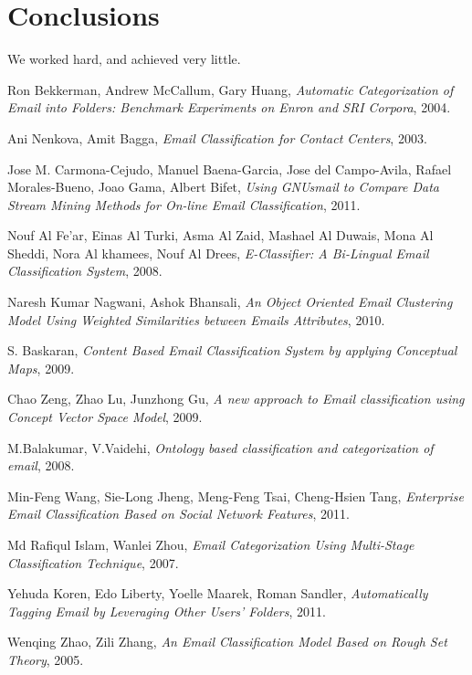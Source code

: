 \documentclass[12pt]{article}
\begin{document}
\section{Conclusions}\label{conclusions}
We worked hard, and achieved very little.


\begin{thebibliography}{99}
  Ron Bekkerman,
  Andrew McCallum,
  Gary Huang,
  \emph{Automatic Categorization of Email into Folders: Benchmark Experiments on Enron and SRI Corpora},
  2004.

  Ani Nenkova,
  Amit Bagga,
  \emph{Email Classification for Contact Centers},
  2003.

  Jose M. Carmona-Cejudo,
  Manuel Baena-Garcia,
  Jose del Campo-Avila,
  Rafael Morales-Bueno,
  Joao Gama,
  Albert Bifet,
  \emph{Using GNUsmail to Compare Data Stream Mining Methods for On-line Email Classification},
  2011.

  Nouf Al Fe'ar,
  Einas Al Turki,
  Asma Al Zaid,
  Mashael Al Duwais,
  Mona Al Sheddi,
  Nora Al khamees,
  Nouf Al Drees,
  \emph{E-Classifier: A Bi-Lingual Email Classification System},
  2008.

  Naresh Kumar Nagwani,
  Ashok Bhansali,
  \emph{An Object Oriented Email Clustering Model Using Weighted Similarities between Emails Attributes},
  2010.


  S. Baskaran,
  \emph{Content Based Email Classification System by applying Conceptual Maps},
  2009.

  Chao Zeng,
  Zhao Lu,
  Junzhong Gu,
  \emph{A new approach to Email classification using Concept Vector Space Model},
  2009.

  M.Balakumar,
  V.Vaidehi,
  \emph{Ontology based classification and categorization of email},
  2008.

  Min-Feng Wang,
  Sie-Long Jheng,
  Meng-Feng Tsai,
  Cheng-Hsien Tang,
  \emph{Enterprise Email Classification Based on Social Network Features},
  2011.

  Md Rafiqul Islam,
  Wanlei Zhou,
  \emph{Email Categorization Using Multi-Stage Classification Technique},
  2007.

  Yehuda Koren,
  Edo Liberty,
  Yoelle Maarek,
  Roman Sandler,
  \emph{Automatically Tagging Email by Leveraging Other Users' Folders},
  2011.

  Wenqing Zhao,
  Zili Zhang,
  \emph{An Email Classification Model Based on Rough Set Theory},
  2005.


\end{thebibliography}
\end{document}
